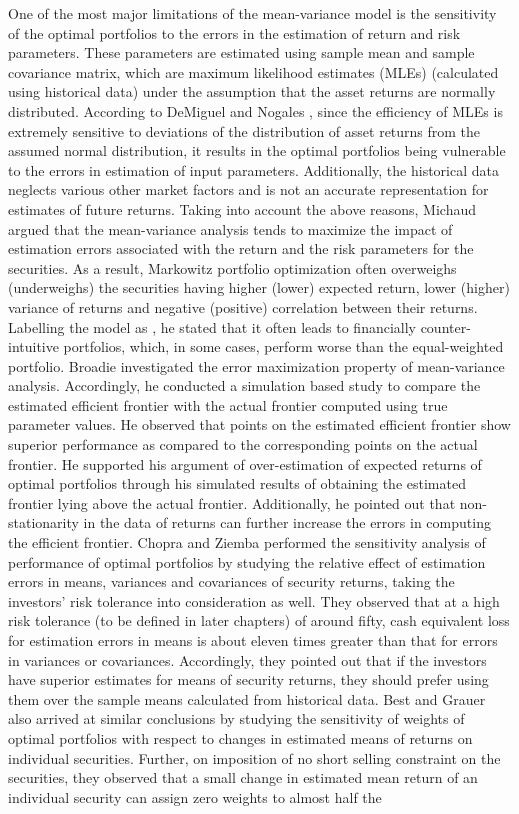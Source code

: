 \documentclass[12pt]{article}
\numberwithin{equation}{section}
\begin{document}
One of the most major limitations of the mean-variance model is the sensitivity of the optimal portfolios to the errors in the estimation of return and risk parameters. These parameters are estimated using sample mean and sample covariance matrix, which are maximum likelihood estimates (MLEs) (calculated using historical data) under the assumption that the asset returns are normally distributed. According to DeMiguel and Nogales \cite{demiguel}, since the efficiency of MLEs is extremely sensitive to deviations of the distribution of asset returns from the assumed normal distribution, it results in the optimal portfolios being vulnerable to the errors in estimation of input parameters. Additionally, the historical data neglects various other market factors and is not an accurate representation for estimates of future returns. Taking into account the above reasons, Michaud \cite{Michaud} argued that the mean-variance analysis tends to maximize the impact of estimation errors associated with the return and the risk parameters for the securities. As a result, Markowitz portfolio optimization often overweighs (underweighs) the securities having higher (lower) expected return, lower (higher) variance of returns and negative (positive) correlation between their returns. Labelling the model as , he stated that it often leads to financially counter-intuitive portfolios, which, in some cases, perform worse than the equal-weighted portfolio. Broadie \cite{Broadie} investigated the error maximization property of mean-variance analysis. Accordingly, he conducted a simulation based study to compare the estimated efficient frontier with the actual frontier computed using true parameter values. He observed that points on the estimated efficient frontier show superior performance as compared to the corresponding points on the actual frontier. He supported his argument of over-estimation of expected returns of optimal portfolios through his simulated results of obtaining the estimated frontier lying above the actual frontier. Additionally, he pointed out that non-stationarity in the data of returns can further increase the errors in computing the efficient frontier. Chopra and Ziemba \cite{Chopra} performed the sensitivity analysis of performance of optimal portfolios by studying the relative effect of estimation errors in means, variances and covariances of security returns, taking the investors' risk tolerance into consideration as well. They observed that at a high risk tolerance (to be defined in later chapters) of around fifty, cash equivalent loss for estimation errors in means is about eleven times greater than that for errors in variances or covariances. Accordingly, they pointed out that if the investors have superior estimates for means of security returns, they should prefer using them over the sample means calculated from historical data. Best and Grauer \cite{Best1,Best2} also arrived at similar conclusions by studying the sensitivity of weights of optimal portfolios with respect to changes in estimated means of returns on individual securities. Further, on imposition of no short selling constraint on the securities, they observed that a small change in estimated mean return of an individual security can assign zero weights to almost half the 
\end{document}
